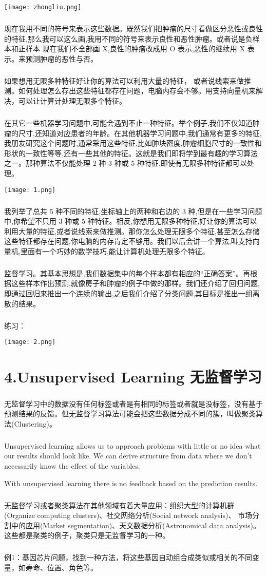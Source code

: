 \documentclass{article}
\begin{document}
\begin{CJK}{UTF8}{gbsn}
\texttt{[image: zhongliu.png]}
\subparagraph*{}
现在我用不同的符号来表示这些数据。既然我们把肿瘤的尺寸看做区分恶性或良性的特征,那么我可以这么画,我用不同的符号来表示良性和恶性肿瘤。或者说是负样本和正样本
现在我们不全部画 X,良性的肿瘤改成用 O 表示,恶性的继续用 X 表示。来预测肿瘤的恶性与否。
\subparagraph*{}
如果想用无限多种特征好让你的算法可以利用大量的特征，
或者说线索来做推测。如何处理怎么存出这些特征都存在问题，电脑内存会不够。用支持向量机来解决，可以让计算计处理无限多个特征。
\subparagraph*{}
在其它一些机器学习问题中,可能会遇到不止一种特征。举个例子,我们不仅知道肿瘤的尺寸,还知道对应患者的年龄。在其他机器学习问题中,我们通常有更多的特征,我朋友研究这个问题时,通常采用这些特征,比如肿块密度,肿瘤细胞尺寸的一致性和形状的一致性等等,还有一些其他的特征。这就是我们即将学到最有趣的学习算法之一。那种算法不仅能处理 2 种 3 种或 5 种特征,即使有无限多种特征都可以处理。

\texttt{[image: 1.png]}
\subparagraph*{}
我列举了总共 5 种不同的特征,坐标轴上的两种和右边的 3 种,但是在一些学习问题中,你希望不只用 3 种或 5 种特征。相反,你想用无限多种特征,好让你的算法可以
利用大量的特征,或者说线索来做推测。那你怎么处理无限多个特征,甚至怎么存储这些特征都存在问题,你电脑的内存肯定不够用。我们以后会讲一个算法,叫支持向量机,里面有一个巧妙的数学技巧,能让计算机处理无限多个特征。
\subparagraph*{}
监督学习。其基本思想是,我们数据集中的每个样本都有相应的“正确答案”。再根据这些样本作出预测,就像房子和肿瘤的例子中做的那样。我们还介绍了回归问题,即通过回归来推出一个连续的输出,之后我们介绍了分类问题,其目标是推出一组离散的结果。
\subparagraph*{}
练习：

\texttt{[image: 2.png]}
\section*{4.Unsupervised Learning 无监督学习}
\subparagraph*{}
无监督学习中的数据没有任何标签或者是有相同的标签或者就是没标签，没有基于预测结果的反馈。但无监督学习算法可能会把这些数据分成不同的簇，叫做聚类算法(Clustering)。
\subparagraph*{}
Unsupervised learning allows us to approach problems with little or no idea what our results should look like. We can derive structure from data where we don't necessarily know the effect of the variables.

With unsupervised learning there is no feedback based on the prediction results.
\subparagraph*{}
无监督学习或者聚类算法在其他领域有着大量应用：组织大型的计算机群(Organize computing clusters)、社交网络分析(Social network analysis)、
市场分割中的应用(Market segmentation)、天文数据分析(Astronomical data analysis)。这些都是聚类的例子，聚类只是无监督学习的一种。
\subparagraph*{}
例1：基因芯片问题，找到一种方法，将这些基因自动组合成类似或相关的不同变量，如寿命、位置、角色等。


\end{CJK}
\end{document}
